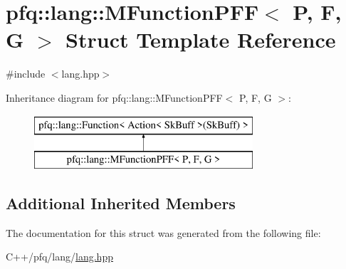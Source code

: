 \hypertarget{structpfq_1_1lang_1_1MFunctionPFF}{\section{pfq\+:\+:lang\+:\+:M\+Function\+P\+F\+F$<$ P, F, G $>$ Struct Template Reference}
\label{structpfq_1_1lang_1_1MFunctionPFF}
}


{\ttfamily \#include $<$lang.\+hpp$>$}

Inheritance diagram for pfq\+:\+:lang\+:\+:M\+Function\+P\+F\+F$<$ P, F, G $>$\+:\begin{figure}[H]
\begin{center}
\leavevmode
\includegraphics[height=2.000000cm]{structpfq_1_1lang_1_1MFunctionPFF}
\end{center}
\end{figure}
\subsection*{Additional Inherited Members}


The documentation for this struct was generated from the following file\+:\begin{DoxyCompactItemize}
\item 
C++/pfq/lang/\hyperlink{lang_8hpp}{lang.\+hpp}\end{DoxyCompactItemize}
